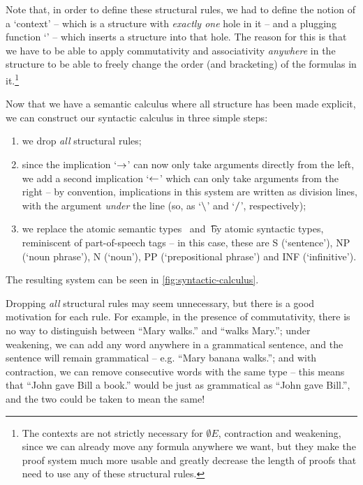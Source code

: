 \documentclass[a4paper]{article}
\begin{document}


Note that, in order to define these structural rules, we had to define
the notion of a `context' --  which is a structure with \emph{exactly
one} hole in it -- and a plugging function `\plug' -- which inserts a
structure into that hole. The reason for this is that we have to be
able to apply commutativity and associativity \emph{anywhere} in the
structure to be able to freely change the order (and bracketing) of
the formulas in it.\footnote{%
  The contexts are not strictly necessary for $\emptyset E$,
  contraction and weakening, since we can already move any formula
  anywhere we want, but they make the proof system much more usable
  and greatly decrease the length of proofs that need to use any of
  these structural rules.
}

Now that we have a semantic calculus where all structure has been made
explicit, we can construct our syntactic calculus in three simple
steps:
\begin{enumerate}
\item%
  we drop \emph{all} structural rules;
\item%
  since the implication `$\rightarrow$' can now only take arguments directly
  from the left, we add a second implication `$\leftarrow$' which can only
  take arguments from the right -- by convention, implications in this
  system are written as division lines, with the argument \emph{under}
  the line (so, as `$\mathbin{\backslash}$' and `$\mathbin{\slash}$', respectively);
\item%
  we replace the atomic semantic types \e\ and \t\ by atomic syntactic
  types, reminiscent of part-of-speech tags -- in this case, these
  are S (`sentence'), NP (`noun phrase'), N (`noun'), PP
  (`prepositional phrase') and INF (`infinitive').
\end{enumerate}
The resulting system can be seen in \autoref{fig:syntactic-calculus}.



Dropping \emph{all} structural rules may seem unnecessary, but there
is a good motivation for each rule.  For example, in the presence of
commutativity, there is no way to distinguish between ``Mary walks.''
and ``walks Mary.''; under weakening, we can add any word anywhere in a
grammatical sentence, and the sentence will remain grammatical --
e.g. ``Mary banana walks.''; and with contraction, we can remove
consecutive words with the same type -- this means that ``John gave
Bill a book.'' would be just as grammatical as ``John gave Bill.'',
and the two could be taken to mean the same!
\end{document}
